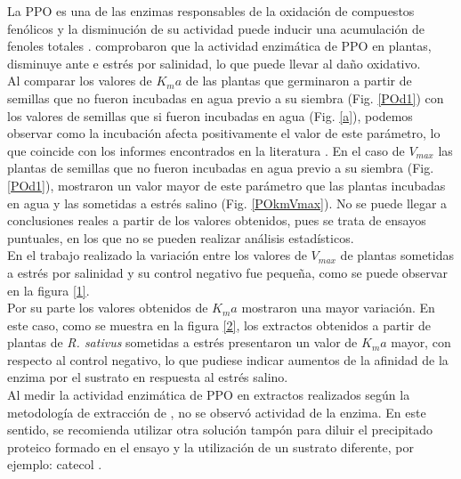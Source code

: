 La PPO es una de las enzimas responsables de la oxidaci\'on de compuestos fen\'olicos \citep{sheen1969studies} y la disminuci\'on de su actividad puede inducir una acumulaci\'on de fenoles totales \citep{das1992sodium}. \cite{muthukumarasamy2000enhancement} comprobaron que la actividad enzim\'atica de PPO en plantas, disminuye ante e estr\'es por salinidad, lo que puede llevar al da\~no oxidativo. \\

Al comparar los valores de $K_ma$ de las plantas que germinaron a partir de semillas que no fueron incubadas en agua previo a su siembra (Fig. \ref{POd1}) con los valores de semillas que si fueron incubadas en agua (Fig. \ref{a}), podemos observar como la incubaci\'on afecta positivamente el valor de este par\'ametro, lo que coincide con los informes encontrados en la literatura \citep{burgass1984evidence, bradford1986manipulation, taylor1998seed, mcdonald2000seed}. En el caso de $V_{max}$ las plantas de semillas que no fueron incubadas en agua previo a su siembra (Fig. \ref{POd1}), mostraron un valor mayor de este par\'ametro que las plantas incubadas en agua y las sometidas a estr\'es salino (Fig. \ref{POkmVmax}). No se puede llegar a conclusiones reales a partir de los valores obtenidos, pues se trata de ensayos puntuales, en los que no se pueden realizar an\'alisis estad\'isticos.\\


En el trabajo realizado la variaci\'on entre los valores de $V_{max}$ de plantas sometidas a estr\'es por salinidad y su control negativo fue peque\~na, como se puede observar en la figura \ref{1}.\\

Por su parte los valores obtenidos de $K_ma$ mostraron una mayor variaci\'on. En este caso, como se muestra en la figura \ref{2}, los extractos obtenidos a partir de plantas de \textit{R. sativus} sometidas a estr\'es presentaron un valor de $K_ma$ mayor, con respecto al control negativo, lo que pudiese indicar aumentos de la afinidad de la enzima por el sustrato en respuesta al estr\'es salino.\\

Al medir la actividad enzim\'atica de PPO en extractos realizados seg\'un la metodolog\'ia de extracci\'on de \cite{baquero2005catalase}, no se observ\'o actividad de la enzima. En este sentido, se recomienda utilizar otra soluci\'on tamp\'on para diluir el precipitado proteico formado en el ensayo y la utilizaci\'on de un sustrato diferente, por ejemplo: catecol \citep{martinez2013actividad}.



